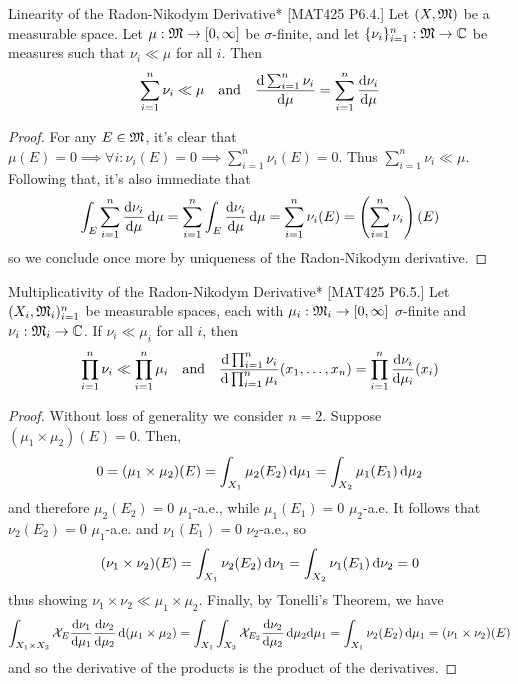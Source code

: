 \begin{problem}{Linearity of the Radon-Nikodym Derivative}*
    [MAT425 P6.4.] Let \((X, \mathfrak{M})\) be a measurable space. Let \(\mu : \mathfrak{M} \to [0, \infty]\) be \(\sigma\)-finite, and let \(\{\nu_i\}_{i=1}^n : \mathfrak{M} \to \mathbb{C}\) be measures such that \(\nu_i \ll \mu\) for all \(i\). Then 
    \[
        \sum_{i=1}^n \nu_i \ll \mu
        \quad \text{and} \quad 
        \frac{\mathrm{d} \sum_{i=1}^n \nu_i}{\mathrm{d} \mu} = \sum_{i=1}^n \frac{\mathrm{d} \nu_i}{\mathrm{d}\mu}
    \]
\end{problem}

\begin{proof}
    For any \(E \in \mathfrak{M}\), it's clear that \(\mu(E) = 0 \implies \forall i: \nu_i(E) = 0 \implies \sum_{i=1}^n \nu_i(E) = 0\). Thus \(\sum_{i=1}^n \nu_i \ll \mu\). Following that, it's also immediate that 
    \[
        \int_E \sum_{i=1}^n \frac{\mathrm{d}\nu_i}{\mathrm{d}\mu} \, \mathrm{d}\mu
        = \sum_{i=1}^n \int_E \frac{\mathrm{d}\nu_i}{\mathrm{d}\mu} \, \mathrm{d}\mu
        = \sum_{i=1}^n \nu_i(E)
        = \left( \sum_{i=1}^n \nu_i \right) (E)
    \]
    so we conclude once more by uniqueness of the Radon-Nikodym derivative. 
\end{proof}

\begin{problem}{Multiplicativity of the Radon-Nikodym Derivative}*
    [MAT425 P6.5.] Let \((X_i, \mathfrak{M}_i)_{i=1}^n\) be measurable spaces, each with \(\mu_i : \mathfrak{M}_i \to [0, \infty]\) \(\sigma\)-finite and \(\nu_i : \mathfrak{M}_i \to \mathbb{C}\). If \(\nu_i \ll \mu_i\) for all \(i\), then
    \[
        \prod_{i=1}^n \nu_i \ll \prod_{i=1}^n \mu_i 
        \quad \text{and} \quad 
        \frac{ \mathrm{d} \prod_{i=1}^n \nu_i }{ \mathrm{d} \prod_{i=1}^n \mu_i } (x_1, \dots, x_n) = \prod_{i=1}^n \frac{\mathrm{d}\nu_i}{\mathrm{d}\mu_i} (x_i) 
    \]
\end{problem}

\begin{proof}
    Without loss of generality we consider \(n=2\). Suppose \((\mu_1 \times \mu_2)(E) = 0\). Then, 
    \[
        0 
        = (\mu_1 \times \mu_2)(E) 
        = \int_{X_1} \mu_2(E_2) \, \mathrm{d}\mu_1
        = \int_{X_2} \mu_1(E_1) \, \mathrm{d}\mu_2
    \]
    and therefore \(\mu_2(E_2) = 0\) \(\mu_1\)-a.e., while \(\mu_1(E_1) = 0\) \(\mu_2\)-a.e. It follows that \(\nu_2(E_2) = 0\) \(\mu_1\)-a.e. and \(\nu_1(E_1) = 0\) \(\nu_2\)-a.e., so 
    \[
        (\nu_1 \times \nu_2)(E) = \int_{X_1} \nu_2(E_2) \, \mathrm{d}\nu_1 = \int_{X_2} \nu_1(E_1) \, \mathrm{d}\nu_2 = 0
    \]
    thus showing \(\nu_1 \times \nu_2 \ll \mu_1 \times \mu_2\). Finally, by Tonelli's Theorem, we have 
    \[
        \int_{X_1 \times X_2} \mathcal{X}_E \frac{\mathrm{d}\nu_1}{\mathrm{d}\mu_1} \frac{\mathrm{d}\nu_2}{\mathrm{d}\mu_2} \, \mathrm{d} (\mu_1 \times \mu_2)
        = \int_{X_1} \int_{X_2} \mathcal{X}_{E_2} \frac{\mathrm{d} \nu_2}{\mathrm{d} \mu_2} \, \mathrm{d} \mu_2 \mathrm{d}\mu_1 
        = \int_{X_1} \nu_2(E_2) \, \mathrm{d}\mu_1
        = (\nu_1 \times \nu_2)(E)
    \]
    and so the derivative of the products is the product of the derivatives. 
\end{proof}



